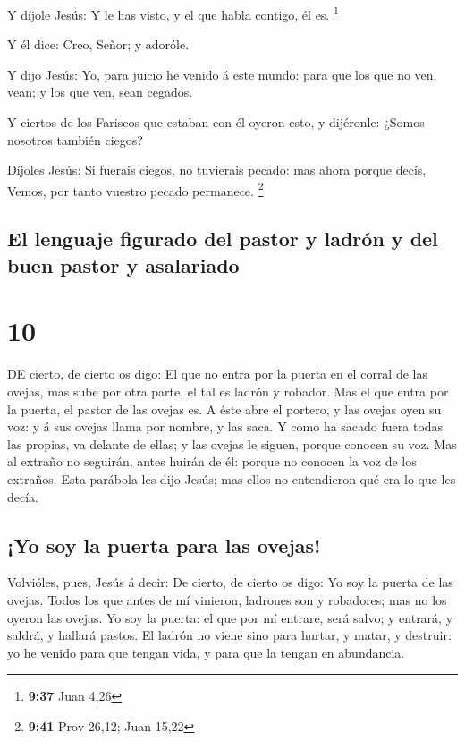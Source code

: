  Y díjole Jesús: Y le has visto, y el que habla contigo, él
es. \footnote{\textbf{9:37} Juan 4,26}

 Y él dice: Creo, Señor; y adoróle.

 Y dijo Jesús: Yo, para juicio he venido á este mundo: para
que los que no ven, vean; y los que ven, sean cegados.

 Y ciertos de los Fariseos que estaban con él oyeron esto,
y dijéronle: ¿Somos nosotros también ciegos?

 Díjoles Jesús: Si fuerais ciegos, no tuvierais pecado: mas
ahora porque decís, Vemos, por tanto vuestro pecado permanece.
\footnote{\textbf{9:41} Prov 26,12; Juan 15,22}

\hypertarget{el-lenguaje-figurado-del-pastor-y-ladruxf3n-y-del-buen-pastor-y-asalariado}{%
\subsection{El lenguaje figurado del pastor y ladrón y del buen pastor y
asalariado}\label{el-lenguaje-figurado-del-pastor-y-ladruxf3n-y-del-buen-pastor-y-asalariado}}

\hypertarget{section-9}{%
\section{10}\label{section-9}}

 DE cierto, de cierto os digo: El que no entra por la puerta
en el corral de las ovejas, mas sube por otra parte, el tal es ladrón y
robador.  Mas el que entra por la puerta, el pastor de las
ovejas es.  A éste abre el portero, y las ovejas oyen su
voz: y á sus ovejas llama por nombre, y las saca.  Y como ha
sacado fuera todas las propias, va delante de ellas; y las ovejas le
siguen, porque conocen su voz.  Mas al extraño no seguirán,
antes huirán de él: porque no conocen la voz de los extraños.
 Esta parábola les dijo Jesús; mas ellos no entendieron qué
era lo que les decía.

\hypertarget{yo-soy-la-puerta-para-las-ovejas}{%
\subsection{¡Yo soy la puerta para las
ovejas!}\label{yo-soy-la-puerta-para-las-ovejas}}

 Volvióles, pues, Jesús á decir: De cierto, de cierto os
digo: Yo soy la puerta de las ovejas.  Todos los que antes
de mí vinieron, ladrones son y robadores; mas no los oyeron las ovejas.
 Yo soy la puerta: el que por mí entrare, será salvo; y
entrará, y saldrá, y hallará pastos.  El ladrón no viene
sino para hurtar, y matar, y destruir: yo he venido para que tengan
vida, y para que la tengan en abundancia.

